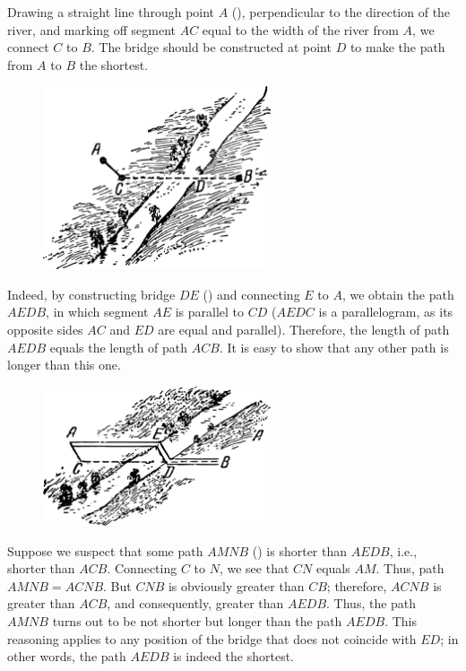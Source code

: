 \ans Drawing a straight line through point $A$ (), perpendicular to the direction of the river, and marking off segment $AC$ equal to the width of the river from $A$, we connect $C$ to $B$. The bridge should be constructed at point $D$ to make the path from $A$ to $B$ the shortest.

\begin{figure}[h!]
\centering
\includegraphics[width=0.6\textwidth]{figures/ch-02/fig-057.pdf}
\end{figure}

Indeed, by constructing bridge $DE$ () and connecting $E$ to $A$, we obtain the path $AEDB$, in which segment $AE$ is parallel to $CD$ ($AEDC$ is a parallelogram, as its opposite sides $AC$ and $ED$ are equal and parallel). Therefore, the length of path $AEDB$ equals the length of path $ACB$. It is easy to show that any other path is longer than this one. 

\begin{figure}[h!]
\centering
\includegraphics[width=0.6\textwidth]{figures/ch-02/fig-058.pdf}
\end{figure}


Suppose we suspect that some path $AMNB$ () is shorter than $AEDB$, i.e., shorter than $ACB$. Connecting $C$ to $N$, we see that $CN$ equals $AM$. Thus, path $AMNB = ACNB$. But $CNB$ is obviously greater than $CB$; therefore, $ACNB$ is greater than $ACB$, and consequently, greater than $AEDB$. Thus, the path $AMNB$ turns out to be not shorter but longer than the path $AEDB$. This reasoning applies to any position of the bridge that does not coincide with $ED$; in other words, the path $AEDB$ is indeed the shortest.

